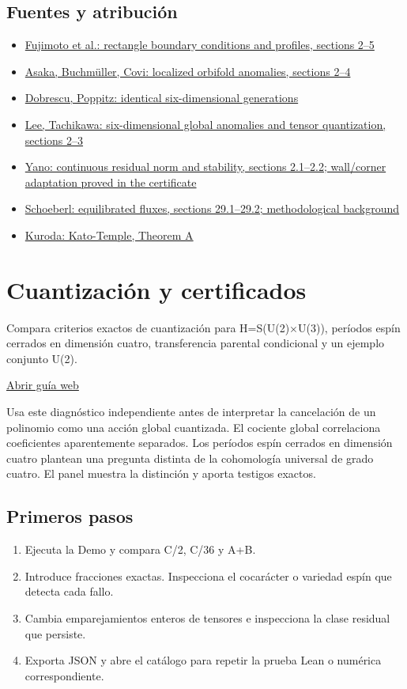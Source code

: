 \documentclass[11pt,a4paper]{article}
\begin{document}
\subsection*{Fuentes y atribución}
\begin{itemize}
\item \href{https://arxiv.org/abs/1609.01413}{Fujimoto et al.: rectangle boundary conditions and profiles, sections 2--5}
\item \href{https://arxiv.org/abs/hep-ph/0209144}{Asaka, Buchmüller, Covi: localized orbifold anomalies, sections 2--4}
\item \href{https://arxiv.org/abs/hep-ph/0102010}{Dobrescu, Poppitz: identical six-dimensional generations}
\item \href{https://arxiv.org/abs/2012.11622}{Lee, Tachikawa: six-dimensional global anomalies and tensor quantization, sections 2--3}
\item \href{https://arrow.utias.utoronto.ca/~myano/papers/myano_ecrbres.pdf}{Yano: continuous residual norm and stability, sections 2.1--2.2; wall/corner adaptation proved in the certificate}
\item \href{https://jschoeberl.github.io/iFEM/aposteriori/equilibrated.html}{Schoeberl: equilibrated fluxes, sections 29.1--29.2; methodological background}
\item \href{https://ems.press/content/serial-article-files/40994}{Kuroda: Kato-Temple, Theorem A}
\end{itemize}
\section{Cuantización y certificados}
Compara criterios exactos de cuantización para H=S(U(2)\ensuremath{\times}U(3)), períodos espín cerrados en dimensión cuatro, transferencia parental condicional y un ejemplo conjunto U(2).

\href{https://karlesmarin.github.io/ghu-explorer/guide/es/quantization/index.html}{Abrir guía web}

Usa este diagnóstico independiente antes de interpretar la cancelación de un polinomio como una acción global cuantizada. El cociente global correlaciona coeficientes aparentemente separados. Los períodos espín cerrados en dimensión cuatro plantean una pregunta distinta de la cohomología universal de grado cuatro. El panel muestra la distinción y aporta testigos exactos.
\subsection*{Primeros pasos}
\begin{enumerate}
\item Ejecuta la Demo y compara C/2, C/36 y A+B.
\item Introduce fracciones exactas. Inspecciona el cocarácter o variedad espín que detecta cada fallo.
\item Cambia emparejamientos enteros de tensores e inspecciona la clase residual que persiste.
\item Exporta JSON y abre el catálogo para repetir la prueba Lean o numérica correspondiente.
\end{enumerate}
\end{document}
